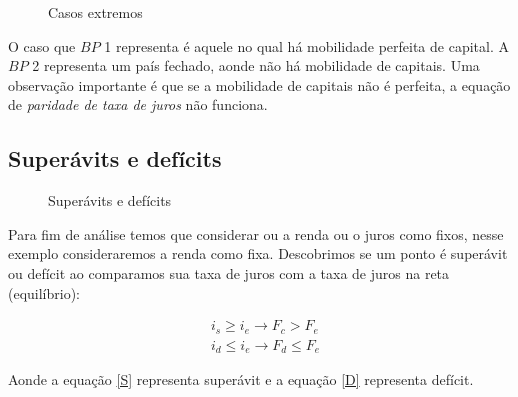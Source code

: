 \documentclass[12pt,a4paper,oneside,brazil]{abntex2}
\begin{document}
\begin{figure}[ht]
    \centering
    \caption{Casos extremos}
\end{figure}

O caso que $BP$ 1 representa é aquele no qual há mobilidade perfeita de capital. A $BP$ 2 representa um país fechado, aonde não há mobilidade de capitais. Uma observação importante é que se a mobilidade de capitais não é perfeita, a equação de \emph{paridade de taxa de juros} não funciona.

\subsection{Superávits e defícits}

\begin{figure}[ht]
    \centering
    \caption{Superávits e defícits}
\end{figure}

Para fim de análise temos que considerar ou a renda ou o juros como fixos, nesse exemplo consideraremos a renda como fixa. Descobrimos se um ponto é superávit ou defícit ao comparamos sua taxa de juros com a taxa de juros na reta (equilíbrio):

\begin{align}
& i_s \geq i_e \rightarrow F_c > F_e \label{S} \\
& i_d \leq i_e \rightarrow F_d \leq F_e \label{D} 
\end{align}

Aonde a equação \ref{S} representa superávit e a equação \ref{D} representa defícit.


\printbibliography
\end{document}
